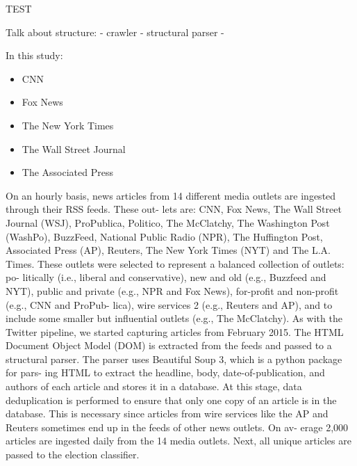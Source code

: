 \cite{PoliticalPolarization}TEST

Talk about structure:
- crawler
- structural parser
- 

In this study:


\begin{itemize}
  \item CNN
  \item Fox News  
  \item The New York Times
  \item The Wall Street Journal
  \item The Associated Press 
\end{itemize}


On an hourly basis, news articles from 14 different media outlets are ingested through their RSS feeds. These out- lets are: CNN, Fox News, The Wall Street Journal (WSJ), ProPublica, Politico, The McClatchy, The Washington Post (WashPo), BuzzFeed, National Public Radio (NPR), The Huffington Post, Associated Press (AP), Reuters, The New York Times (NYT) and The L.A. Times. These outlets were selected to represent a balanced collection of outlets: po- litically (i.e., liberal and conservative), new and old (e.g., Buzzfeed and NYT), public and private (e.g., NPR and Fox News), for-profit and non-profit (e.g., CNN and ProPub- lica), wire services 2 (e.g., Reuters and AP), and to include some smaller but influential outlets (e.g., The McClatchy). As with the Twitter pipeline, we started capturing articles from February 2015.
The HTML Document Object Model (DOM) is extracted from the feeds and passed to a structural parser. The parser uses Beautiful Soup 3, which is a python package for pars- ing HTML to extract the headline, body, date-of-publication, and authors of each article and stores it in a database. At this stage, data deduplication is performed to ensure that only one copy of an article is in the database. This is necessary since articles from wire services like the AP and Reuters sometimes end up in the feeds of other news outlets. On av- erage 2,000 articles are ingested daily from the 14 media outlets. Next, all unique articles are passed to the election classifier.

